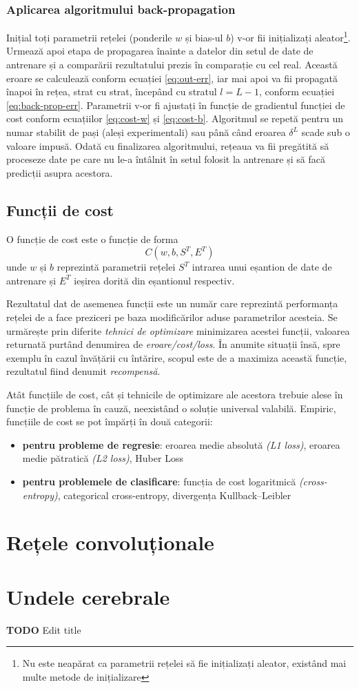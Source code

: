 \subsubsection*{Aplicarea algoritmului back-propagation}
Inițial toți parametrii rețelei (ponderile $w$ și bias-ul $b$) v-or fii inițializați aleator\footnote{Nu este neapărat ca parametrii rețelei să fie inițializați aleator, existând mai multe metode de inițializare}. Urmează apoi etapa de propagarea înainte a datelor din setul de date de antrenare și a comparării rezultatului prezis în comparație cu cel real. Această eroare se calculează conform ecuației \eqref{eq:out-err}, iar mai apoi va fii propagată înapoi în rețea, strat cu strat, începând cu stratul $l = L-1$, conform ecuației \eqref{eq:back-prop-err}. Parametrii v-or fi ajustați în funcție de gradientul funcției de cost conform ecuațiilor \eqref{eq:cost-w} și \eqref{eq:cost-b}. Algoritmul se repetă pentru un numar stabilit de pași (aleși experimentali) sau până când eroarea $\delta^L$ scade sub o valoare impusă. Odată cu finalizarea algoritmului, rețeaua va fii pregătită să proceseze date pe care nu le-a întâlnit în setul folosit la antrenare și să facă predicții asupra acestora.

\subsection{Funcții de cost}\label{subch:f-cost}
O funcție de cost este o funcție de forma \cite{neuralnetbook:2015}
\begin{equation}
C(w,b,S^T,E^T)
\label{eq:cost-form}
\end{equation}
unde $w$ și $b$ reprezintă parametrii rețelei $S^T$ intrarea unui eșantion de date de antrenare și $E^T$ ieșirea dorită din eșantionul respectiv.

Rezultatul dat de asemenea funcții este un număr care reprezintă performanța rețelei de a face preziceri pe baza modificărilor aduse parametrilor acesteia. Se urmărește prin diferite \textit{tehnici de optimizare} minimizarea acestei funcții, valoarea returnată purtând denumirea de \textit{eroare/cost/loss}. În anumite situații însă, spre exemplu în cazul învățării cu întărire, scopul este de a maximiza această funcție, rezultatul fiind denumit \textit{recompensă}.

Atât funcțiile de cost, cât și tehnicile de optimizare ale acestora trebuie alese în funcție de problema în cauză, neexistând o soluție universal valabilă. Empiric, funcțiile de cost se pot împărți în două categorii:
\begin{itemize}
\item \textbf{pentru probleme de regresie}: eroarea medie absolută \textit{(L1 loss)}, eroarea medie pătratică \textit{(L2 loss)},  Huber Loss
\item \textbf{pentru problemele de clasificare}: funcția de cost logaritmică \textit{(cross-entropy)}, categorical cross-entropy, divergența Kullback–Leibler
\end{itemize}

\section{Rețele convoluționale}


\section{Undele cerebrale}
\textbf{TODO} Edit title